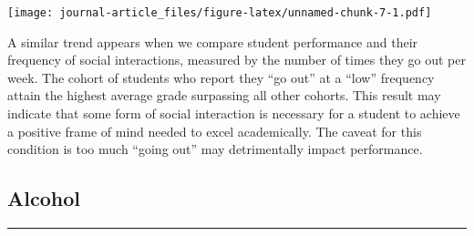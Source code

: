 \documentclass[
]{article}
\newenvironment{Shaded}{\begin{snugshade}}{\end{snugshade}}
\newcommand{\DataTypeTok}[1]{\textcolor[rgb]{0.13,0.29,0.53}{#1}}
\newcommand{\DecValTok}[1]{\textcolor[rgb]{0.00,0.00,0.81}{#1}}
\newcommand{\KeywordTok}[1]{\textcolor[rgb]{0.13,0.29,0.53}{\textbf{#1}}}
\newcommand{\NormalTok}[1]{#1}
\newcommand{\OperatorTok}[1]{\textcolor[rgb]{0.81,0.36,0.00}{\textbf{#1}}}
\newcommand{\OtherTok}[1]{\textcolor[rgb]{0.56,0.35,0.01}{#1}}
\newcommand{\StringTok}[1]{\textcolor[rgb]{0.31,0.60,0.02}{#1}}
\begin{document}
\texttt{[image: journal-article\_files/figure-latex/unnamed-chunk-7-1.pdf]}

A similar trend appears when we compare student performance and their
frequency of social interactions, measured by the number of times they
go out per week. The cohort of students who report they ``go out'' at a
``low'' frequency attain the highest average grade surpassing all other
cohorts. This result may indicate that some form of social interaction
is necessary for a student to achieve a positive frame of mind needed to
excel academically. The caveat for this condition is too much ``going
out'' may detrimentally impact performance.

\hypertarget{alcohol}{%
\subsection{Alcohol}\label{alcohol}}

\begin{center}\rule{0.5\linewidth}{0.5pt}\end{center}

\begin{Shaded}
\end{Shaded}
\end{document}
